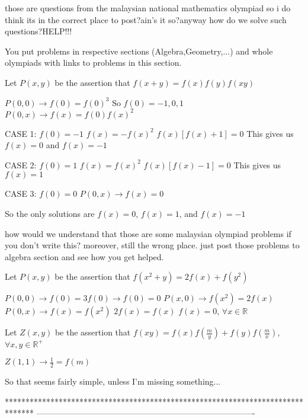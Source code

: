 \begin{solution}
	those are questions from the malaysian national mathematics olympiad so i do think its in the correct place to post?ain's it so?anyway how do we solve such questions?HELP!!!
\end{solution}



\begin{solution}
	You put problems in respective sections (Algebra,Geometry,...) and whole olympiads with links to problems in this section.
\end{solution}



\begin{solution}
	Let $ P(x,y)$ be the assertion that $ f(x+y)=f(x)f(y)f(xy)$

$ P(0,0)\rightarrow f(0)=f(0)^3$
So $ f(0)={-1,0,1}$
$ P(0,x)\rightarrow f(x)=f(0)f(x)^2$

CASE 1:
$ f(0)=-1$
$ f(x)=-f(x)^2$
$ f(x)[f(x)+1]=0$
This gives us $ f(x)=0$ and $ f(x)=-1$

CASE 2:
$ f(0)=1$
$ f(x)=f(x)^2$
$ f(x)[f(x)-1]=0$
This gives us $ f(x)=1$

CASE 3:
$ f(0)=0$
$ P(0,x)\rightarrow f(x)=0$

So the only solutions are $ f(x)=0$, $ f(x)=1$, and $ f(x)=-1$
\end{solution}



\begin{solution}
	how would we understand that those are some malaysian olympiad problems if you don't write this? moreover, still the wrong place. just post those problems to algebra section and see how you get helped.
\end{solution}



\begin{solution}
	Let $ P(x,y)$ be the assertion that $ f(x^2 + y) = 2f(x) + f(y^2)$

$ P(0,0)\rightarrow f(0) = 3f(0)\rightarrow f(0) = 0$
$ P(x,0)\rightarrow f(x^2) = 2f(x)$
$ P(0,x)\rightarrow f(x) = f(x^2)$
$ 2f(x) = f(x)$
$ f(x) = 0$, $ \forall x\in \mathbb R$

Let $ Z(x,y)$ be the assertion that $ f(xy)=f(x)f\left (\frac{m}{y}\right )+f(y)f\left (\frac{m}{x}\right )$, $ \forall x,y\in\mathbb R^+$

$ Z(1,1)\rightarrow \frac{1}{2}=f(m)$

So that seems fairly simple, unless I'm missing something...
\end{solution}
*******************************************************************************
-------------------------------------------------------------------------------

